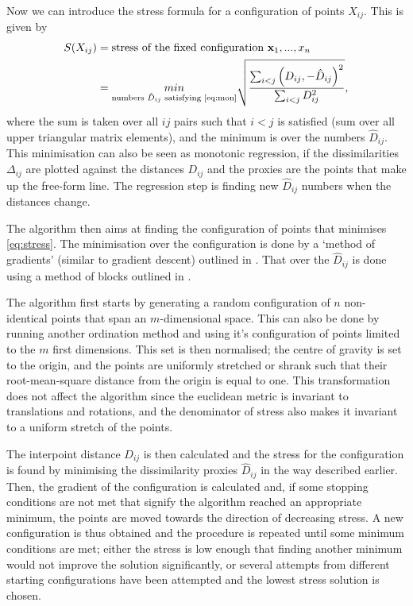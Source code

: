 Now we can introduce the stress formula for a configuration of points $X_{ij}$. This is given by
\begin{align}
	S(X_{ij})&= \text{stress of the fixed configuration } { \mathbf x_1, ...,x_n}\\
	 &=\underset{\text{numbers }\hat{D}_{ij} \text{ satisfying \eqref{eq:mon}}}{ min}
	 \sqrt{\frac{\sum_{i<j}\left(D_{ij},-\hat{D}_{i j}\right)^{2}}{\sum_{i<j} D_{i j}^{2}}},
	 \label{eq:stress}
\end{align}
where the sum is taken over all $ij$ pairs such that $i<j$ is satisfied (sum over all upper triangular matrix elements), and the minimum is over the numbers $\hat{D}_{ij}$. This minimisation can also be seen as monotonic regression, if the dissimilarities $\Delta_{ij}$ are plotted against the distances $D_{ij}$ and the proxies are the points that make up the free-form line. The regression step is finding new $\hat{D}_{ij}$ numbers when the distances change. 

The algorithm then aims at finding the configuration of points that minimises \eqref{eq:stress}. The minimisation over the configuration is done by a `method of gradients' (similar to gradient descent) outlined in \cite{kruskal_nonmetric_1964}. That over the $\hat{D}_{ij}$ is done using a method of blocks outlined in \cite{miles_complete_1959,kruskal_nonmetric_1964}.


The algorithm first starts by generating a random configuration of $n$ non-identical points that span an $m$-dimensional space. This can also be done by running another ordination method and using it's configuration of points limited to the $m$ first dimensions. This set is then normalised; the centre of gravity is set to the origin, and the points are uniformly stretched or shrank such that their root-mean-square distance from the origin is equal to one. This transformation does not affect the algorithm since the euclidean metric is invariant to translations and rotations, and the denominator of stress also makes it invariant to a uniform stretch of the points. 

 The interpoint distance $D_{ij}$ is then calculated and the stress for the configuration is found by minimising the dissimilarity proxies  $\hat{D}_{ij}$ in the way described earlier. Then, the gradient of the configuration is calculated and, if some stopping conditions are not met that signify the algorithm reached an appropriate minimum, the points are moved towards the direction of decreasing stress. A new configuration is thus obtained and the procedure is repeated until some minimum conditions are met; either the stress is low enough that finding another minimum would not improve the solution significantly, or several attempts from different starting configurations have been attempted and the lowest stress solution is chosen. 

